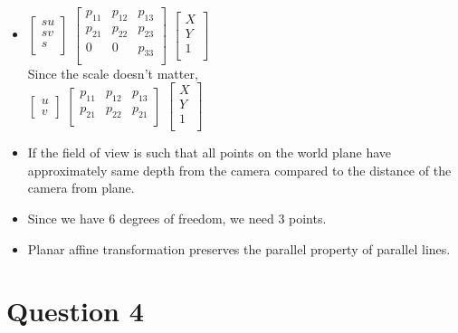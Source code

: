 \documentclass{article}
\begin{document}
\begin{itemize}
  
\item $\begin{bmatrix}
    su\\
    sv\\
    s\\
\end{bmatrix}$ $\begin{bmatrix}
    p_{11} &  p_{12} &  p_{13}\\
    p_{21} &  p_{22} &  p_{23}\\
    0 &  0 &  p_{33}\\
\end{bmatrix}$ $\begin{bmatrix}
    X\\
    Y\\
    1\\
\end{bmatrix}$ \\

Since the scale doesn't matter, \\

$\begin{bmatrix}
    u\\
    v
\end{bmatrix}$ $\begin{bmatrix}
    p_{11} &  p_{12} &  p_{13}\\
    p_{21} &  p_{22} &  p_{21}\\
\end{bmatrix}$ $\begin{bmatrix}
    X\\
    Y\\
    1\\
\end{bmatrix}$ \\

\item If the field of view is such that all points on the world plane have approximately same depth
  from the camera compared to the distance of the camera from plane.

\item Since we have 6 degrees of freedom, we need 3 points.
  
\item Planar affine transformation preserves the parallel property of parallel lines.  
\end{itemize}

\section*{Question 4}
\end{document}
